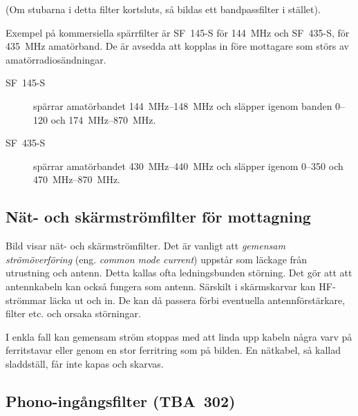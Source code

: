 (Om stubarna i detta filter kortsluts, så bildas ett bandpassfilter i stället).

Exempel på kommersiella spärrfilter är SF~145-S för \SI{144}{\mega\hertz} och
SF~435-S, för \SI{435}{\mega\hertz} amatörband.
De är avsedda att kopplas in före mottagare som störs av amatörradiosändningar.

\begin{description}
\item[SF~145-S] spärrar amatörbandet \SIrange{144}{148}{\mega\hertz} och släpper
igenom banden 0--120 och \SIrange{174}{870}{\mega\hertz}.

\item[SF~435-S] spärrar amatörbandet \SIrange{430}{440}{\mega\hertz} och släpper
igenom 0--350 och \SIrange{470}{870}{\mega\hertz}.
\end{description}

\subsection{Nät- och skärmströmfilter för mottagning}


Bild  visar nät- och skärmströmfilter.
Det är vanligt att \emph{gemensam strömöverföring} (eng.
\emph{common mode current}) uppstår som läckage från utrustning och antenn.
Detta kallas ofta ledningsbunden störning.
Det gör att att antennkabeln kan också fungera som antenn.
Särskilt i skärmskarvar kan HF-strömmar läcka ut och in.
De kan då passera förbi eventuella antennförstärkare, filter etc. och orsaka
störningar.

I enkla fall kan gemensam ström stoppas med att linda upp kabeln några varv på
ferritstavar eller genom en stor ferritring som på bilden.
En nätkabel, så kallad sladdställ, får inte kapas och skarvas.

\newpage
\subsection{Phono-ingångsfilter (TBA~302)}



